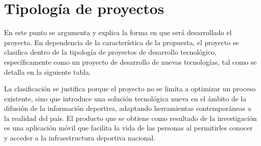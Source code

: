
\section{Tipolog\'ia de proyectos}

En este punto se argumenta y explica la forma en que ser\'a desarrollado el
proyecto. En dependencia de la caracter\'istica de la propuesta, el proyecto se
clasifica dentro de la tipolog\'ia de proyectos de desarrollo tecnol\'ogico,
espec\'ificamente como un proyecto de desarrollo de nuevas tecnolog\'ias, tal
como se detalla en la siguiente tabla.

\begin{table}[H]
  \centering
  \caption{Clasificaci\'on del proyecto seg\'un su tipolog\'ia}
  \label{tab:tipologia}
\end{table}

La clasificaci\'on se justifica porque el proyecto no se limita a optimizar un
proceso existente, sino que introduce una soluci\'on tecnol\'ogica nueva en el
\'ambito de la difusi\'on de la informaci\'on deportiva, adaptando herramientas
contempor\'aneas a la realidad del pa\'is. El producto que se obtiene como
resultado de la investigaci\'on es una aplicaci\'on m\'ovil que facilita la vida
de las personas al permitirles conocer y acceder a la infraestructura
deportiva nacional.
